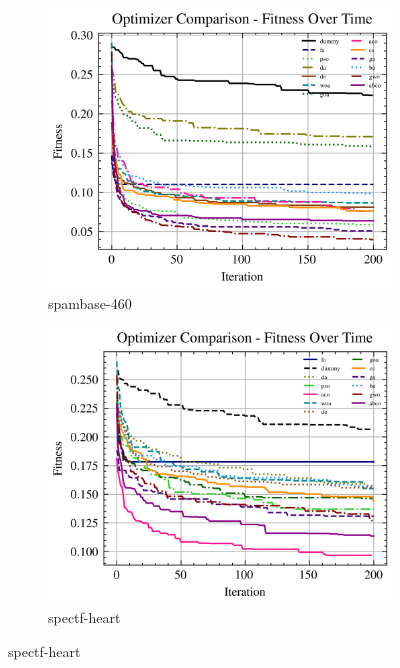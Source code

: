 \begin{figure}[htp]
    \centering
    \begin{subfigure}[b]{0.45\textwidth}
        \includegraphics[width=\textwidth]{imagenes/fitness_charts/img/binary/spambase-460/optimizers_fitness_svc.png}
        \caption{spambase-460}
        \label{fig:convergencia_spambase-460_svc}
    \end{subfigure}
    \begin{subfigure}[b]{0.45\textwidth}
        \includegraphics[width=\textwidth]{imagenes/fitness_charts/img/binary/spectf-heart/optimizers_fitness_svc.png}
        \caption{spectf-heart}
        \label{fig:convergencia_spectf-heart_svc}
    \end{subfigure}


\end{figure}
